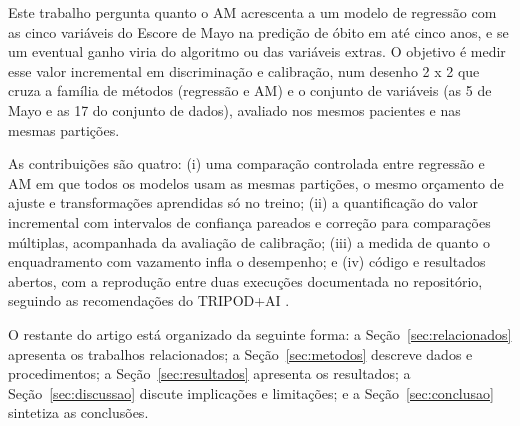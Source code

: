 Este trabalho pergunta quanto o AM acrescenta a um modelo de regressão com as cinco variáveis do Escore de Mayo na predição de óbito em até cinco anos, e se um eventual ganho viria do algoritmo ou das variáveis extras. O objetivo é medir esse valor incremental em discriminação e calibração, num desenho 2 x 2 que cruza a família de métodos (regressão e AM) e o conjunto de variáveis (as 5 de Mayo e as 17 do conjunto de dados), avaliado nos mesmos pacientes e nas mesmas partições.

As contribuições são quatro: (i) uma comparação controlada entre regressão e AM em que todos os modelos usam as mesmas partições, o mesmo orçamento de ajuste e transformações aprendidas só no treino; (ii) a quantificação do valor incremental com intervalos de confiança pareados e correção para comparações múltiplas, acompanhada da avaliação de calibração; (iii) a medida de quanto o enquadramento com vazamento infla o desempenho; e (iv) código e resultados abertos, com a reprodução entre duas execuções documentada no repositório, seguindo as recomendações do TRIPOD+AI \cite{collins2024tripodai}.

O restante do artigo está organizado da seguinte forma: a Seção~\ref{sec:relacionados} apresenta os trabalhos relacionados; a Seção~\ref{sec:metodos} descreve dados e procedimentos; a Seção~\ref{sec:resultados} apresenta os resultados; a Seção~\ref{sec:discussao} discute implicações e limitações; e a Seção~\ref{sec:conclusao} sintetiza as conclusões.
